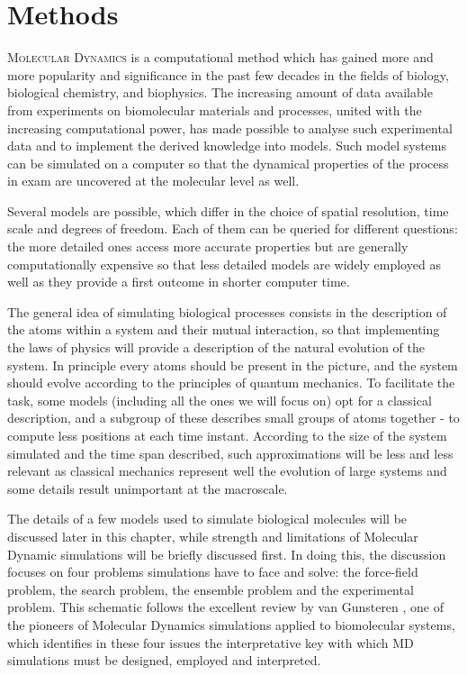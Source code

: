 \chapter{Methods}

\lettrine{M}{olecular Dynamics} is a computational method which has gained more and more popularity and significance in the past few decades in the fields of biology, biological chemistry, and biophysics.
%
The increasing amount of data available from experiments on biomolecular materials and processes, united with the increasing computational power, has made possible to analyse such experimental data and to implement the derived knowledge into models.
%
Such model systems can be simulated on a computer so that the dynamical properties of the process in exam are uncovered at the molecular level as well.

Several models are possible, which differ in the choice of spatial resolution, time scale and degrees of freedom.
%
Each of them can be queried for different questions: the more detailed ones access more accurate properties but are generally computationally expensive so that less detailed models are widely employed as well as they provide a first outcome in shorter computer time.

The general idea of simulating biological processes consists in the description of the atoms within a system and their mutual interaction, so that implementing the laws of physics will provide a description of the natural evolution of the system. In principle every atoms should be present in the picture, and the system should evolve according to the principles of quantum mechanics. To facilitate the task, some models (including all the ones we will focus on) opt for a classical description, and a subgroup of these describes small groups of atoms together - to compute less positions at each time instant. According to the size of the system simulated and the time span described, such approximations will be less and less relevant as classical mechanics represent well the evolution of large systems and some details result unimportant at the macroscale.

The details of a few models used to simulate biological molecules will be discussed later in this chapter, while  strength and limitations of Molecular Dynamic simulations will be briefly discussed first.
%
In doing this, the discussion focuses on four problems simulations have to face and solve: the force-field problem, the search problem, the ensemble problem and the experimental problem. This schematic follows the excellent review by van Gunsteren \cite{...}, one of the pioneers of Molecular Dynamics simulations applied to biomolecular systems, which identifies in these four issues the interpretative key with which MD simulations must be designed, employed and interpreted.


